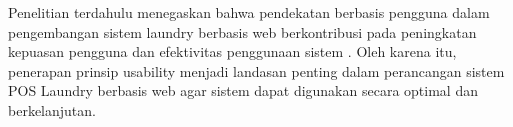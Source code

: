 Penelitian terdahulu menegaskan bahwa pendekatan berbasis pengguna dalam pengembangan sistem laundry berbasis web berkontribusi pada peningkatan kepuasan pengguna dan efektivitas penggunaan sistem \cite{Kalo2023,Singh2022}. Oleh karena itu, penerapan prinsip usability menjadi landasan penting dalam perancangan sistem POS Laundry berbasis web agar sistem dapat digunakan secara optimal dan berkelanjutan.
